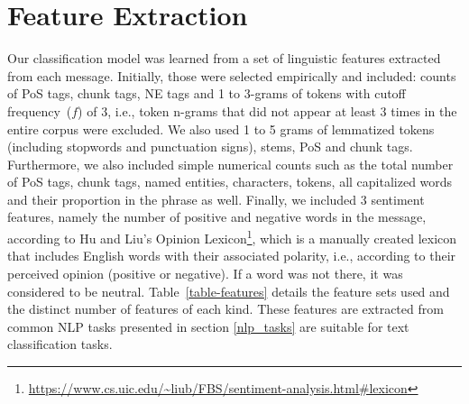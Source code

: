 \section{Feature Extraction}\label{sec:features}

Our classification model was learned from a set of linguistic features extracted from each message. Initially, those were selected empirically and included: counts of PoS tags, chunk tags, NE tags and 1 to 3-grams of tokens with cutoff frequency~($f$) of 3, i.e., token n-grams that did not appear at least 3 times in the entire corpus were excluded.
We also used 1 to 5 grams of lemmatized tokens (including stopwords and punctuation signs), stems, PoS and chunk tags. Furthermore, we also included simple numerical counts such as the total number of PoS tags, chunk tags, named entities, characters, tokens, all capitalized words and their proportion in the phrase as well.
Finally, we included 3 sentiment features, namely the number of positive and negative words in the message, according to Hu and Liu's Opinion Lexicon\footnote{\url{https://www.cs.uic.edu/~liub/FBS/sentiment-analysis.html\#lexicon}}, which is a manually created lexicon that includes English words with their associated polarity, i.e., according to their perceived opinion (positive or negative). If a word was not there, it was considered to be neutral.
Table~\ref{table-features} details the feature sets used and the distinct number of features of each kind. These features are extracted from common NLP tasks presented in section \ref{nlp_tasks} are suitable for text classification tasks\citep{scott1999feature,moschitti2004complex,Biro2008LDASpam,liu2010sentiment}.

